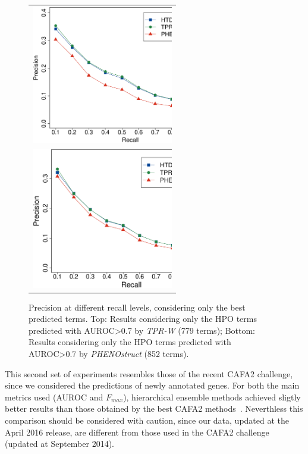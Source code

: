 \documentclass{bioinfo}
\begin{document}
\begin{figure}[!b]
\centering
\begin{tabular}{c}	
\includegraphics[width=6.2cm]{Fig_ExpII/PXR_curves_Shrink_TPRWfilter.eps} \\
\includegraphics[width=6.2cm]{Fig_ExpII/PXR_curves_Shrink_PHENOfilter.eps} \\
\end{tabular}
\caption{Precision at different recall levels, considering only the best predicted terms. Top: Results considering only the HPO terms predicted with AUROC>0.7 by {\em TPR-W} (779 terms); Bottom: Results considering only the HPO terms predicted with AUROC>0.7 by {\em PHENOstruct} (852 terms).}
\label{fig:pxr-best}
\end{figure}


This second set of experiments   resembles those of the recent CAFA2 challenge, since we considered the predictions of newly annotated genes.  For both the main metrics used (AUROC and $F_{max}$), hierarchical ensemble methods achieved sligtly better results than those obtained by the best CAFA2 methods~\citep{Jiang16}. Neverthless this comparison should be considered with caution, since our  data, updated at the April 2016 release, are different from those used in the CAFA2 challenge (updated at September 2014).
\end{document}
